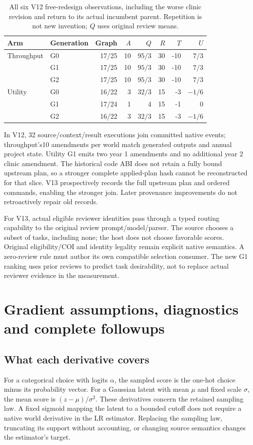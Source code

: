 \begin{table}[h]\centering\small
\caption{All six V12 free-redesign observations, including the worse clinic
revision and return to its actual incumbent parent. Repetition is not new
invention; $Q$ uses original review means.}
\label{tab:integrated-v12-all}
\begin{tabular}{llrrrrrr}\toprule
Arm & Generation & Graph & $A$ & $Q$ & $R$ & $T$ & $U$\\\midrule
Throughput&G0&17/25&10&$95/3$&30&-10&$7/3$\\
&G1&17/25&10&$95/3$&30&-10&$7/3$\\
&G2&17/25&10&$95/3$&30&-10&$7/3$\\\addlinespace
Utility&G0&16/22&3&$32/3$&15&-3&$-1/6$\\
&G1&17/24&1&4&15&-1&0\\
&G2&16/22&3&$32/3$&15&-3&$-1/6$\\\bottomrule
\end{tabular}\end{table}

In V12, 32 source/context/result executions join committed native events;
throughput's10 amendments per world match generated outputs and annual
project state. Utility G1 emits two year 1 amendments and no additional year 2
clinic amendment. The historical code ABI does not retain a fully bound
upstream plan, so a stronger complete applied-plan hash cannot be reconstructed
for that slice. V13 prospectively records the full upstream plan and ordered
commands, enabling the stronger join. Later provenance improvements do not
retroactively repair old records.

For V13, actual eligible reviewer identities pass through a typed routing
capability to the original review prompt/model/parser. The source chooses a
subset of tasks, including none; the host does not choose favorable scores.
Original eligibility/COI and identity legality remain explicit native semantics.
A zero-review rule must author its own compatible selection consumer. The
new G1 ranking uses prior reviews to predict task desirability, not to replace
actual reviewer evidence in the measurement.

\FloatBarrier
\section{Gradient assumptions, diagnostics and complete followups}
\label{app:gradient}
\subsection{What each derivative covers}
For a categorical choice with logits $\alpha $, the sampled score is the
one-hot choice minus its probability vector. For a Gaussian latent with mean
$\mu $ and fixed scale $\sigma $, the mean score is $(z-\mu)/\sigma^2$.
These derivatives concern the retained sampling law. A fixed sigmoid mapping
the latent to a bounded cutoff does not require a native world derivative in
the LR estimator. Replacing the sampling law, truncating its support without
accounting, or changing source semantics changes the estimator's target.

